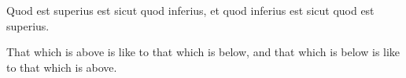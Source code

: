 Quod est superius est sicut quod inferius, et quod inferius est sicut quod est superius.

That which is above is like to that which is below, and that which is below is like to that which is above.
